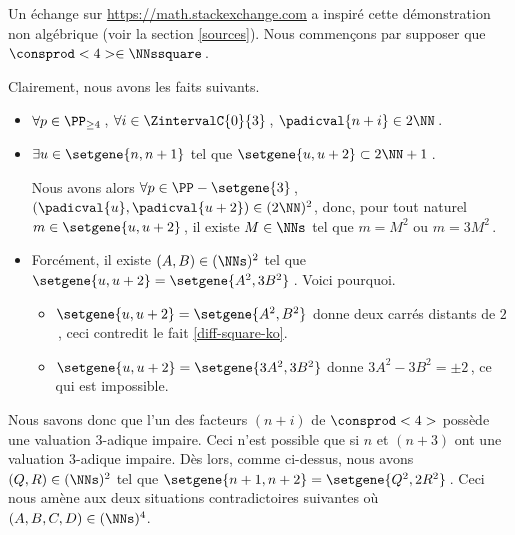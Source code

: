 Un échange sur \url{https://math.stackexchange.com} a inspiré cette démonstration non algébrique (voir la section \ref{sources}).	
Nous commençons par supposer que $\consprod<4> \in \NNssquare$\,.

\smallskip

Clairement, nous avons les faits suivants.
%
\begin{itemize}
	\item  
	$\forall p \in \PP_{\geq 4}$\,, 
	$\forall i \in \ZintervalC{0}{3}$\,, 
	$\padicval{n + i} \in 2 \NN$\,.
	
	
	\item $\exists u \in \setgene{n, n+1}$ tel que $\setgene{u, u + 2} \subset 2 \NN + 1$\,.
		
	\noindent
	Nous avons alors
	$\forall p \in \PP - \setgene{3}$\,, 
	$(\padicval{u}, \padicval{u+2}) \in ( 2 \NN )^2$,
	donc, pour tout naturel $m \in \setgene{u, u + 2}$\,, 
	il existe $M \in \NNs$ tel que 
	$m = M^2$ ou $m = 3 M^2$\,.
	
	
	\item Forcément, il existe $(A, B) \in ( \NNs )^2$ tel que 
    $\setgene{u, u + 2} = \setgene{A^2, 3 B^2}$\,. Voici pourquoi.
    \begin{itemize}
    	\item $\setgene{u, u + 2} = \setgene{A^2, B^2}$ donne deux carrés distants de $2$\,, ceci contredit le fait \ref{diff-square-ko}.

    	\item $\setgene{u, u + 2} = \setgene{3 A^2, 3 B^2}$ donne $3 A^2 - 3 B^2 = \pm 2$\,, ce qui est impossible.
    \end{itemize}
\end{itemize}

\smallskip
	
Nous savons donc que l'un des facteurs $(n+i)$ de $\consprod<4>$ possède une valuation $3$-adique impaire. Ceci n'est possible que si $n$ et $(n+3)$ ont une valuation $3$-adique impaire.
Dès lors, comme ci-dessus, nous avons $(Q, R) \in ( \NNs )^2$ tel que $\setgene{n+1, n+2} = \setgene{Q^2, 2 R^2}$\,.
Ceci nous amène aux deux situations contradictoires suivantes où $(A, B, C, D) \in ( \NNs )^4$.
	
